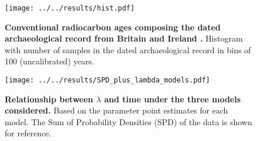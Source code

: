 \documentclass[a4paper]{article}
\begin{document}



\begin{figure}
\center\texttt{[image: ../../results/hist.pdf]}
\caption{\textbf{Conventional radiocarbon ages composing the dated archaeological record from Britain and Ireland \parencite{Bevan2017a}.} Histogram with number of samples in the dated archaeological record in bins of 100 (uncalibrated) years.}
\label{fig:data}
\end{figure}



\begin{figure}[h]
\begin{center}
\texttt{[image: ../../results/SPD\_plus\_lambda\_models.pdf]}
\end{center}
\caption{\textbf{Relationship between $\lambda$ and time under the three models considered.} Based on the parameter point estimates for each model. The Sum of Probability Densities (SPD) of the data is shown for reference.}
\label{fig:skylines}
\end{figure}
\end{document}

